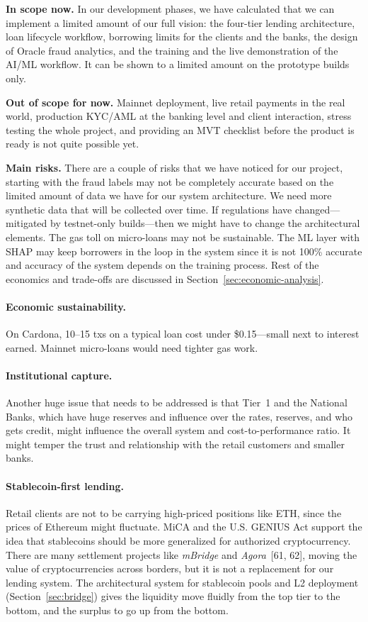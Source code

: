\textbf{In scope now.} In our development phases, we have calculated that we can implement a limited amount of our full vision: the four-tier lending architecture, loan lifecycle workflow, borrowing limits for the clients and the banks, the design of Oracle fraud analytics, and the training and the live demonstration of the AI/ML workflow. It can be shown to a limited amount on the prototype builds only.

\textbf{Out of scope for now.} Mainnet deployment, live retail payments in the real world, production KYC/AML at the banking level and client interaction, stress testing the whole project, and providing an MVT checklist before the product is ready is not quite possible yet.

\textbf{Main risks.} There are a couple of risks that we have noticed for our project, starting with the fraud labels may not be completely accurate based on the limited amount of data we have for our system architecture. We need more synthetic data that will be collected over time. If regulations have changed---mitigated by testnet-only builds---then we might have to change the architectural elements. The gas toll on micro-loans may not be sustainable. The ML layer with SHAP may keep borrowers in the loop in the system since it is not 100\% accurate and accuracy of the system depends on the training process. Rest of the economics and trade-offs are discussed in Section~\ref{sec:economic-analysis}.

\paragraph{Economic sustainability.} On Cardona, 10--15 txs on a typical loan cost under \$0.15---small next to interest earned. Mainnet micro-loans would need tighter gas work.

\paragraph{Institutional capture.} Another huge issue that needs to be addressed is that Tier~1 and the National Banks, which have huge reserves and influence over the rates, reserves, and who gets credit, might influence the overall system and cost-to-performance ratio. It might temper the trust and relationship with the retail customers and smaller banks.

\paragraph{Stablecoin-first lending.}
\label{sec:stablecoin-first}
Retail clients are not to be carrying high-priced positions like ETH, since the prices of Ethereum might fluctuate. MiCA and the U.S. GENIUS Act support the idea that stablecoins should be more generalized for authorized cryptocurrency. There are many settlement projects like \textit{mBridge} and \textit{Agora}~[61, 62], moving the value of cryptocurrencies across borders, but it is not a replacement for our lending system. The architectural system for stablecoin pools and L2 deployment (Section~\ref{sec:bridge}) gives the liquidity move fluidly from the top tier to the bottom, and the surplus to go up from the bottom.

